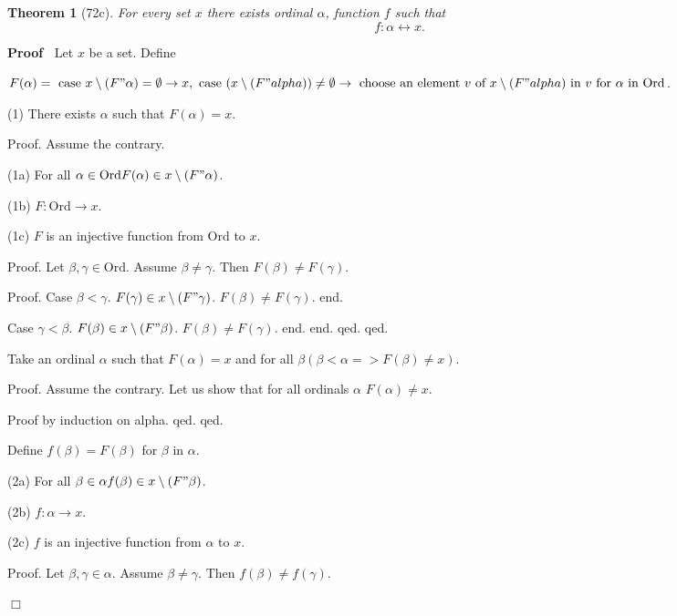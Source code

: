 \documentclass{article}
\newenvironment{forthel}{\begin{leftbar}}{\end{leftbar}}
\newenvironment{proof}{\noindent\textbf{Proof\ }}{\hspace*{\fill}$\Box$\medskip}
\newtheorem{theorem}{Theorem}
\begin{document}
\begin{forthel}
\begin{theorem}[72c] For every set $x$ there exists 
  ordinal $\alpha$, function $f$ 
  such that $$f : \alpha \leftrightarrow x.$$
\end{theorem}
\begin{proof} Let $x$ be a set. Define 

$F(\alpha) = \text{ case } x \setminus (F " \alpha) =
  \emptyset \rightarrow x,
  \text{ case } (x \setminus (F " alpha)) \neq \emptyset \rightarrow 
  \text{ choose an element } v \text{ of } x \setminus (F " alpha) 
  \text{ in } v
  \text{ for } \alpha \text{ in } \mathrm{Ord}$. 

  (1) There exists $\alpha$ such that $F(\alpha) = x$.
  
  Proof. Assume the contrary.
  
    (1a) For all $\alpha \in \mathrm{Ord} F(\alpha) \in x 
    \setminus (F " \alpha)$.

    (1b) $F : \mathrm{Ord} \rightarrow x$.

    (1c) $F$ is an injective function from $\mathrm{Ord}$ to $x$.

    Proof. Let $\beta,\gamma \in \mathrm{Ord}$. 
      Assume $\beta \neq \gamma$.
      Then $F(\beta) \neq F(\gamma)$.

      Proof. 
        Case $\beta < \gamma$. 
          $F(\gamma) \in x \setminus (F " \gamma)$.  
          $F(\beta) \neq F(\gamma)$. 
        end.

        Case $\gamma < \beta$. 
          $F(\beta) \in x \setminus (F " \beta)$. 
          $F(\beta) \neq F(\gamma)$. 
        end.
      end.
    qed.
  qed.

  Take an ordinal $\alpha$ such that $F(\alpha) = x$ and 
  for all $\beta (\beta < \alpha => F(\beta) \neq x)$.

  Proof. Assume the contrary.
    Let us show that for all ordinals $\alpha$ $F(\alpha) \neq x$.

    Proof by induction on alpha. qed. qed.
    
      Define $f(\beta) = F(\beta)$ for $\beta$ in $\alpha$.

      (2a) For all 
        $\beta \in \alpha f(\beta) \in x \setminus (F " \beta)$.

      (2b) $f : \alpha \rightarrow x$.

      (2c) $f$ is an injective function from $\alpha$ to $x$.

      Proof. Let $\beta,\gamma \in \alpha$. 
        Assume $\beta \neq \gamma$.
        Then $f(\beta) \neq f(\gamma)$.


\end{proof}
\end{forthel}
\end{document}
